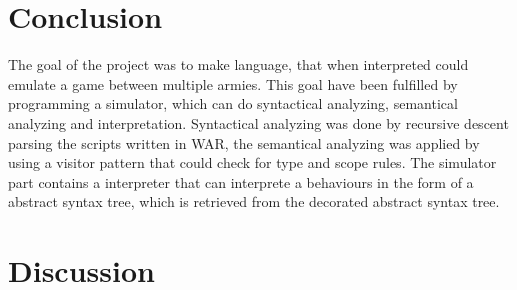 \section{Conclusion}
	The goal of the project was to make language, that when interpreted could emulate a game between multiple armies. 
	This goal have been fulfilled by programming a simulator, which can do syntactical analyzing, semantical analyzing and interpretation.
	Syntactical analyzing was done by recursive descent parsing the scripts written in WAR, the semantical analyzing was applied by using 
	a visitor pattern that could check for type and scope rules. The simulator part contains a interpreter that can interprete 
	a behaviours in the form of a abstract syntax tree, which is retrieved from the decorated abstract syntax tree.
	 



\section{Discussion}